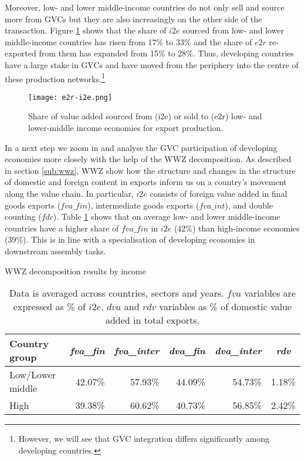 \documentclass[11pt,a4paper]{article}
\begin{document}
Moreover, low- and lower middle-income countries do not only sell and source more from GVCs but they are also increasingly on the other side of the transaction. Figure \ref{fig:llmpartner} shows that the share of $i2e$ sourced from low- and lower middle-income countries has risen from 17\% to 33\% and the share of $e2r$ re-exported from them has expanded from 15\% to 28\%. Thus, developing countries have a large stake in GVCs and have moved from the periphery into the centre of these production networks.\footnote{However, we will see that GVC integration differs significantly among developing countries.}

\begin{figure}[h]
\centering
\texttt{[image: e2r-i2e.png]}
\caption{Share of value added sourced from (i2e) or sold to (e2r) low- and lower-middle income economies for export production.}
\label{fig:llmpartner}
\end{figure}

In a next step we zoom in and analyse the GVC participation of developing economies more closely with the help of the WWZ decomposition. As described in section \ref{sub:wwz}, WWZ show how the structure and changes in the structure of domestic and foreign content in exports inform us on a country's movement along the value chain. In particular, $i2e$ consists of foreign value added in final goods exports ($fva\_fin$), intermediate goods exports ($fva\_int$), and double counting ($fdc$). Table \ref{tab:wwz} shows that on average low- and lower middle-income countries have a higher share of $fva\_fin$ in $i2e$ (42\%) than high-income economies (39\%). This is in line with a specialisation of developing economies in downstream assembly tasks.

\begin{table}[htbp]\small
  \centering
  \caption{WWZ decomposition results by income}
    \begin{tabular}{lrrrrr}
    \toprule
    Country group & \multicolumn{1}{c}{\textit{fva\_fin}} & \multicolumn{1}{c}{\textit{fva\_inter}} & \multicolumn{1}{c}{\textit{dva\_fin}} & \multicolumn{1}{c}{\textit{dva\_inter}} & \multicolumn{1}{c}{\textit{rdv}} \\
    \midrule
    Low/Lower middle & 42.07\% & 57.93\% & 44.09\% & 54.73\% & 1.18\% \\
    High  & 39.38\% & 60.62\% & 40.73\% & 56.85\% & 2.42\% \\
    \bottomrule
    \end{tabular}
  \label{tab:wwz}
  \caption*{Data is averaged across countries, sectors and years. $fva$ variables are expressed as \% of $i2e$, $dva$ and $rdv$ variables as \% of domestic value added in total exports.}
\end{table}
\end{document}

